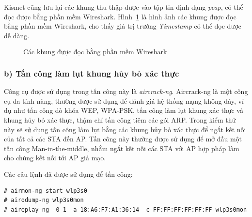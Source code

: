 Kismet cũng lưu lại các khung thu thập được vào tập tin định dạng \emph{pcap}, có thể đọc được bằng phần mềm Wireshark. Hình~\ref{fig:bss-timestamp-wireshark} là hình ảnh các khung được đọc bằng phần mềm Wireshark, cho thấy giá trị trường \emph{Timestamp} có thể đọc được dễ dàng.

\begin{figure}[H]
    \centering
    \caption{
        \label{fig:bss-timestamp-wireshark}
        Các khung được đọc bằng phần mềm Wireshark}
\end{figure}

\subsubsection*{b) Tấn công làm lụt khung hủy bỏ xác thực}
Công cụ được sử dụng trong tấn công này là \emph{aircrack-ng}. Aircrack-ng là một công cụ đa tính năng, thường được sử dụng để đánh giá hệ thống mạng không dây, ví dụ như tấn công dò khóa WEP, WPA-PSK, tấn công làm lụt khung xác thực và khung hủy bỏ xác thực, thậm chí tấn công tiêm các gói ARP. Trong kiểm thử này sẽ sử dụng tấn công làm lụt bằng các khung hủy bỏ xác thực để ngắt kết nối của tất cả các STA đến AP.  Tấn công này thường được sử dụng để mở đầu một tấn công Man-in-the-middle, nhằm ngắt kết nối các STA với AP hợp pháp làm cho chúng kết nối tới AP giả mạo.

Các câu lệnh đã được sử dụng để tấn công:\\

\begin{lstlisting}
# airmon-ng start wlp3s0
# airodump-ng wlp3s0mon
# aireplay-ng -0 1 -a 18:A6:F7:A1:36:14 -c FF:FF:FF:FF:FF:FF wlp3s0mon
\end{lstlisting}

